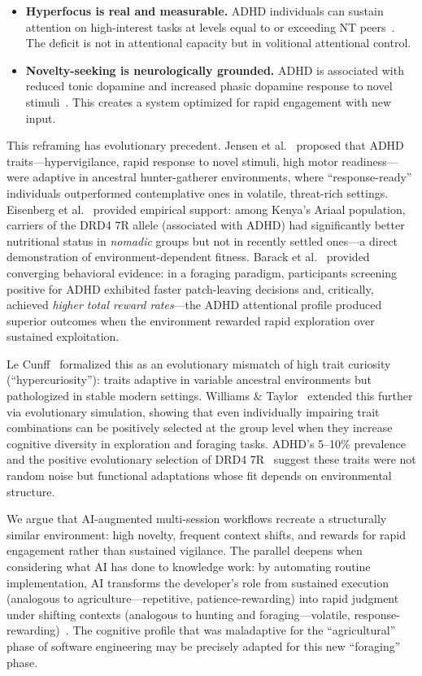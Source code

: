 \documentclass[sigconf,nonacm]{acmart}
\begin{document}
\begin{itemize}
  \item \textbf{Hyperfocus is real and measurable.} ADHD individuals can sustain attention on high-interest tasks at levels equal to or exceeding NT peers~\cite{ashinoff2021}. The deficit is not in attentional capacity but in volitional attentional control.
  \item \textbf{Novelty-seeking is neurologically grounded.} ADHD is associated with reduced tonic dopamine and increased phasic dopamine response to novel stimuli~\cite{volkow2009}. This creates a system optimized for rapid engagement with new input.
\end{itemize}

This reframing has evolutionary precedent. Jensen et al.~\cite{jensen1997} proposed that ADHD traits---hypervigilance, rapid response to novel stimuli, high motor readiness---were adaptive in ancestral hunter-gatherer environments, where ``response-ready'' individuals outperformed contemplative ones in volatile, threat-rich settings. Eisenberg et al.~\cite{eisenberg2008} provided empirical support: among Kenya's Ariaal population, carriers of the DRD4 7R allele (associated with ADHD) had significantly better nutritional status in \emph{nomadic} groups but not in recently settled ones---a direct demonstration of environment-dependent fitness. Barack et al.~\cite{barack2024} provided converging behavioral evidence: in a foraging paradigm, participants screening positive for ADHD exhibited faster patch-leaving decisions and, critically, achieved \emph{higher total reward rates}---the ADHD attentional profile produced superior outcomes when the environment rewarded rapid exploration over sustained exploitation.

Le Cunff~\cite{lecunff2024} formalized this as an evolutionary mismatch of high trait curiosity (``hypercuriosity''): traits adaptive in variable ancestral environments but pathologized in stable modern settings. Williams \& Taylor~\cite{williams2006} extended this further via evolutionary simulation, showing that even individually impairing trait combinations can be positively selected at the group level when they increase cognitive diversity in exploration and foraging tasks. ADHD's 5--10\% prevalence and the positive evolutionary selection of DRD4 7R~\cite{williams2006} suggest these traits were not random noise but functional adaptations whose fit depends on environmental structure.

We argue that AI-augmented multi-session workflows recreate a structurally similar environment: high novelty, frequent context shifts, and rewards for rapid engagement rather than sustained vigilance. The parallel deepens when considering what AI has done to knowledge work: by automating routine implementation, AI transforms the developer's role from sustained execution (analogous to agriculture---repetitive, patience-rewarding) into rapid judgment under shifting contexts (analogous to hunting and foraging---volatile, response-rewarding)~\cite{ranganathan2026, bedard2026}. The cognitive profile that was maladaptive for the ``agricultural'' phase of software engineering may be precisely adapted for this new ``foraging'' phase.
\end{document}
